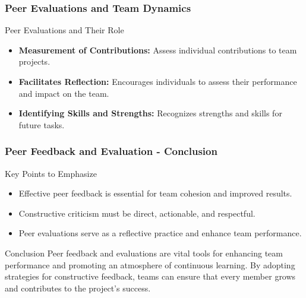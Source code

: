 \documentclass[aspectratio=169]{beamer}
\begin{document}
\begin{frame}[fragile]
    \frametitle{Peer Evaluations and Team Dynamics}
    \begin{block}{Peer Evaluations and Their Role}
        \begin{itemize}
            \item \textbf{Measurement of Contributions:} Assess individual contributions to team projects.
            \item \textbf{Facilitates Reflection:} Encourages individuals to assess their performance and impact on the team.
            \item \textbf{Identifying Skills and Strengths:} Recognizes strengths and skills for future tasks.
        \end{itemize}
    \end{block}
\end{frame}

\begin{frame}[fragile]
    \frametitle{Peer Feedback and Evaluation - Conclusion}
    \begin{block}{Key Points to Emphasize}
        \begin{itemize}
            \item Effective peer feedback is essential for team cohesion and improved results.
            \item Constructive criticism must be direct, actionable, and respectful.
            \item Peer evaluations serve as a reflective practice and enhance team performance.
        \end{itemize}
    \end{block}
    \begin{block}{Conclusion}
        Peer feedback and evaluations are vital tools for enhancing team performance and promoting an atmosphere of continuous learning. By adopting strategies for constructive feedback, teams can ensure that every member grows and contributes to the project's success.
    \end{block}
\end{frame}
\end{document}
